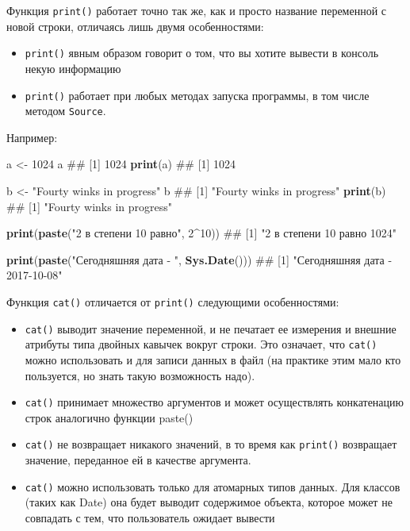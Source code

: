 \documentclass[]{book}
\newenvironment{Shaded}{\begin{snugshade}}{\end{snugshade}}
\newcommand{\KeywordTok}[1]{\textcolor[rgb]{0.13,0.29,0.53}{\textbf{#1}}}
\newcommand{\DecValTok}[1]{\textcolor[rgb]{0.00,0.00,0.81}{#1}}
\newcommand{\StringTok}[1]{\textcolor[rgb]{0.31,0.60,0.02}{#1}}
\newcommand{\OperatorTok}[1]{\textcolor[rgb]{0.81,0.36,0.00}{\textbf{#1}}}
\newcommand{\NormalTok}[1]{#1}
\providecommand{\tightlist}{%
  \setlength{\itemsep}{0pt}\setlength{\parskip}{0pt}}
\begin{document}
Функция \texttt{print()} работает точно так же, как и просто название
переменной с новой строки, отличаясь лишь двумя особенностями:

\begin{itemize}
\tightlist
\item
  \texttt{print()} явным образом говорит о том, что вы хотите вывести в
  консоль некую информацию
\item
  \texttt{print()} работает при любых методах запуска программы, в том
  числе методом \texttt{Source}.
\end{itemize}

Например:

\begin{Shaded}
\begin{Highlighting}[]
\NormalTok{a <-}\StringTok{ }\DecValTok{1024}
\NormalTok{a}
\NormalTok{## [1] 1024}
\KeywordTok{print}\NormalTok{(a)}
\NormalTok{## [1] 1024}

\NormalTok{b <-}\StringTok{ "Fourty winks in progress"}
\NormalTok{b}
\NormalTok{## [1] "Fourty winks in progress"}
\KeywordTok{print}\NormalTok{(b)}
\NormalTok{## [1] "Fourty winks in progress"}

\KeywordTok{print}\NormalTok{(}\KeywordTok{paste}\NormalTok{(}\StringTok{"2 в степени 10 равно"}\NormalTok{, }\DecValTok{2}\OperatorTok{^}\DecValTok{10}\NormalTok{))}
\NormalTok{## [1] "2 в степени 10 равно 1024"}

\KeywordTok{print}\NormalTok{(}\KeywordTok{paste}\NormalTok{(}\StringTok{"Сегодняшняя дата - "}\NormalTok{, }\KeywordTok{Sys.Date}\NormalTok{()))}
\NormalTok{## [1] "Сегодняшняя дата -  2017-10-08"}
\end{Highlighting}
\end{Shaded}

Функция \texttt{cat()} отличается от \texttt{print()} следующими
особенностями:

\begin{itemize}
\tightlist
\item
  \texttt{cat()} выводит значение переменной, и не печатает ее измерения
  и внешние атрибуты типа двойных кавычек вокруг строки. Это означает,
  что \texttt{cat()} можно использовать и для записи данных в файл (на
  практике этим мало кто пользуется, но знать такую возможность надо).
\item
  \texttt{cat()} принимает множество аргументов и может осуществлять
  конкатенацию строк аналогично функции paste()
\item
  \texttt{cat()} не возвращает никакого значений, в то время как
  \texttt{print()} возвращает значение, переданное ей в качестве
  аргумента.
\item
  \texttt{cat()} можно использовать только для атомарных типов данных.
  Для классов (таких как Date) она будет выводит содержимое объекта,
  которое может не совпадать с тем, что пользователь ожидает вывести
\end{itemize}
\end{document}
